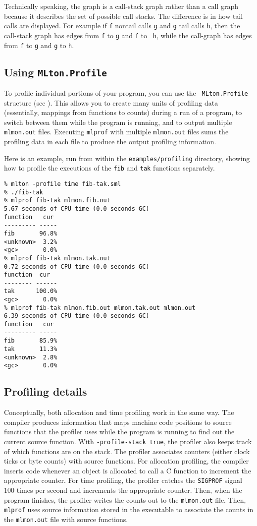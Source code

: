 Technically speaking, the graph is a call-stack graph rather than a
call graph because it describes the set of possible call stacks.  The
difference is in how tail calls are displayed.  For example if {\tt f}
nontail calls {\tt g} and {\tt g} tail calls {\tt h}, then the
call-stack graph has edges from {\tt f} to {\tt g} and {\tt f} to {\tt
h}, while the call-graph has edges from {\tt f} to {\tt g} and {\tt g}
to {\tt h}.

\subsection{Using {\tt MLton.Profile}}

To profile individual portions of your program, you can use the {\tt
MLton.Profile} structure (see ).  This
allows you to create many units of profiling data (essentially,
mappings from functions to counts) during a run of a program, to
switch between them while the program is running, and to output
multiple {\tt mlmon.out} files.  Executing {\tt mlprof} with multiple
{\tt mlmon.out} files sums the profiling data in each file to produce
the output profiling information.

Here is an example, run from within the {\tt examples/profiling}
directory, showing how to profile the executions of the {\tt fib} and
{\tt tak} functions separately.

\begin{verbatim}
% mlton -profile time fib-tak.sml
% ./fib-tak
% mlprof fib-tak mlmon.fib.out
5.67 seconds of CPU time (0.0 seconds GC)
function   cur 
--------- -----
fib       96.8%
<unknown>  3.2%
<gc>       0.0%
% mlprof fib-tak mlmon.tak.out
0.72 seconds of CPU time (0.0 seconds GC)
function  cur  
-------- ------
tak      100.0%
<gc>       0.0%
% mlprof fib-tak mlmon.fib.out mlmon.tak.out mlmon.out
6.39 seconds of CPU time (0.0 seconds GC)
function   cur 
--------- -----
fib       85.9%
tak       11.3%
<unknown>  2.8%
<gc>       0.0%
\end{verbatim}

\subsection{Profiling details}

Conceptually, both allocation and time profiling work in the same way.
The compiler produces information that maps machine code positions to
source functions that the profiler uses while the program is running
to find out the current source function.  With {\tt -profile-stack
true}, the profiler also keeps track of which functions are on the
stack.  The profiler associates counters (either clock ticks or byte
counts) with source functions.  For allocation profiling, the compiler
inserts code whenever an object is allocated to call a C function to
increment the appropriate counter.  For time profiling, the profiler
catches the {\tt SIGPROF} signal 100 times per second and increments
the appropriate counter.  Then, when the program finishes, the
profiler writes the counts out to the {\tt mlmon.out} file.  Then,
{\tt mlprof} uses source information stored in the executable to
associate the counts in the {\tt mlmon.out} file with source
functions.

